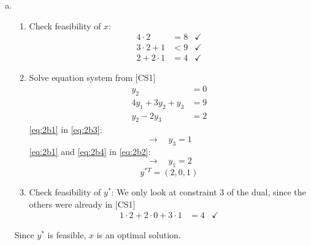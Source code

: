 \documentclass[a4paper,12pt,headsepline]{scrartcl}
\begin{document}
\begin{enumerate}[a)]
  \item
    \begin{enumerate}[1.]
      \item Check feasibility of $x$:
        \begin{align*}
          4\cdot 2 &= 8 &\checkmark \\
          3\cdot 2 + 1 &< 9 &\checkmark \\
          2 + 2\cdot 1 &= 4 &\checkmark
        \end{align*}
      \item Solve equation system from [CS1]
        \begin{align}
          y_2 &= 0 \label{eq:2b1}\\
          4y_1 + 3y_2 + y_3 &= 9 \label{eq:2b2}\\
          y_2 - 2y_3 &= 2 \label{eq:2b3}
        \end{align}
        \eqref{eq:2b1} in \eqref{eq:2b3}:
        \begin{equation}\label{eq:2b4}
          \rightarrow\quad y_3=1
        \end{equation}
        \eqref{eq:2b1} and \eqref{eq:2b4} in \eqref{eq:2b2}:
        \begin{equation}
          \rightarrow\quad y_1=2
        \end{equation}
        \[ y^{*T} = (2,0,1) \]
      \item Check feasibility of $y^*$: We only look at constraint 3 of the dual, since the others were already in [CS1]
        \begin{align*}
          1\cdot 2 + 2\cdot 0 + 3\cdot 1 &= 4 &\checkmark
        \end{align*}
    \end{enumerate}
    Since $y^*$ is feasible, $x$ is an optimal solution.
\end{enumerate}
\newpage
\end{document}
